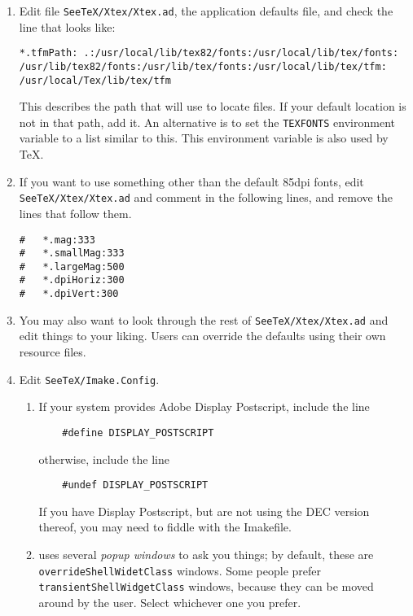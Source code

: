 \begin{enumerate}
\item
	Edit file \verb|SeeTeX/Xtex/Xtex.ad|, the application defaults file,
	and check the line that looks like:
\begin{verbatim}
*.tfmPath: .:/usr/local/lib/tex82/fonts:/usr/local/lib/tex/fonts:
/usr/lib/tex82/fonts:/usr/lib/tex/fonts:/usr/local/lib/tex/tfm:
/usr/local/Tex/lib/tex/tfm
\end{verbatim}
	This describes the path that {\xtex} will use to locate {\TFM} files.
	If your default {\TFM} location is not in that path, add it.
	An alternative is to set the {\tt TEXFONTS} environment variable
	to a list similar to this. This environment variable is also used by
	{\TeX}.

\item	If you want to use something other than the default 85dpi fonts,
	edit \verb|SeeTeX/Xtex/Xtex.ad| and comment in the following lines,
	and remove the lines that follow them.
\begin{verbatim}
#	*.mag:333
#	*.smallMag:333
#	*.largeMag:500
#	*.dpiHoriz:300
#	*.dpiVert:300
\end{verbatim}

\item	You may also want to look through the rest of
	\verb|SeeTeX/Xtex/Xtex.ad| and edit things to your liking.
	Users can override the defaults using their own resource files.

\item	Edit \verb|SeeTeX/Imake.Config|.
\begin{enumerate}

\item If your system provides Adobe Display Postscript,
	include the line 
\begin{verbatim}
	#define DISPLAY_POSTSCRIPT
\end{verbatim}
	otherwise, include the line
\begin{verbatim}
	#undef DISPLAY_POSTSCRIPT
\end{verbatim}
	If you have Display Postscript, but are not using the DEC
	version thereof, you may need to fiddle with the Imakefile.

\item	{\xtex} uses several {\em popup windows} to ask you things;
	by default, \goodbreak
	these are {\tt overrideShellWidetClass} windows. \goodbreak
	Some people prefer {\tt transientShellWidgetClass} windows,
	because they can be moved
	around by the user. Select whichever one you prefer.
\end{enumerate}
\end{enumerate}

